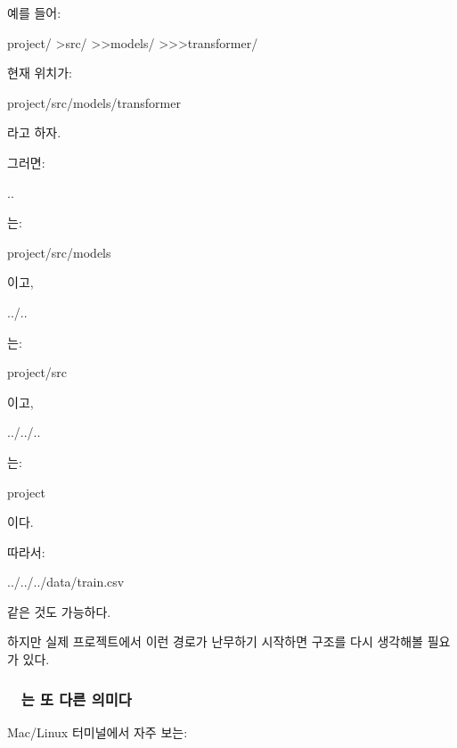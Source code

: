 예를 들어:

\begin{dhkdir}
project/
>src/
>>models/
>>>transformer/
\end{dhkdir}

현재 위치가:

\begin{dhkzsh}
project/src/models/transformer
\end{dhkzsh}

라고 하자.

그러면:

\begin{dhkzsh}
..
\end{dhkzsh}

는:

\begin{dhkzsh}
project/src/models
\end{dhkzsh}

이고,

\begin{dhkzsh}
../..
\end{dhkzsh}

는:

\begin{dhkzsh}
project/src
\end{dhkzsh}

이고,

\begin{dhkzsh}
../../..
\end{dhkzsh}

는:

\begin{dhkzsh}
project
\end{dhkzsh}

이다.

따라서:

\begin{dhkzsh}
../../../data/train.csv
\end{dhkzsh}

같은 것도 가능하다.

하지만 실제 프로젝트에서 이런 경로가 난무하기 시작하면 구조를 다시 생각해볼 필요가 있다.

\subsubsection{~ 는 또 다른 의미다}

Mac/Linux 터미널에서 자주 보는:

\begin{dhkzsh}
~ 
\end{dhkzsh}

